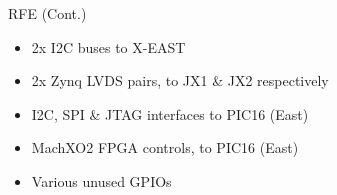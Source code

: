 \documentclass{beamer}
\begin{document}
\begin{frame}{RFE (Cont.)}
    \begin{itemize}
    \item 2x I2C buses to X-EAST
    \item 2x Zynq LVDS pairs, to JX1 \& JX2 respectively
    \item I2C, SPI \& JTAG interfaces to PIC16 (East)
    \item MachXO2 FPGA controls, to PIC16 (East)
    \item Various unused GPIOs
    \end{itemize}
\end{frame}
\end{document}
